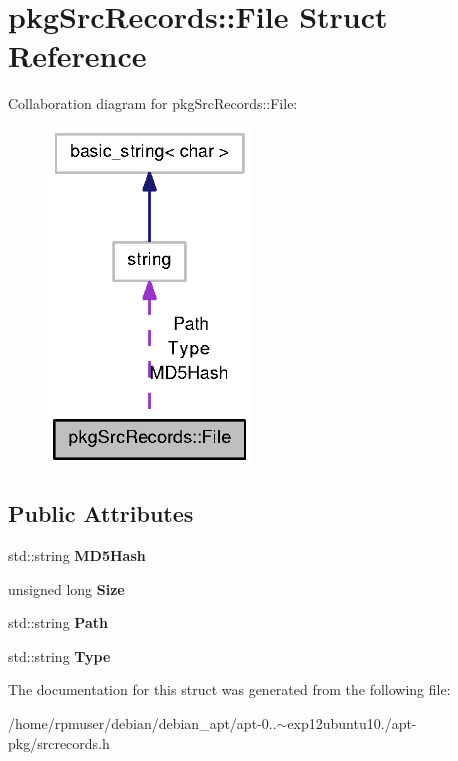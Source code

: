 \section{pkg\-Src\-Records\-:\-:\-File \-Struct \-Reference}
\label{structpkgSrcRecords_1_1File}


\-Collaboration diagram for pkg\-Src\-Records\-:\-:\-File\-:
\nopagebreak
\begin{figure}[H]
\begin{center}
\leavevmode
\includegraphics[width=152pt]{structpkgSrcRecords_1_1File__coll__graph}
\end{center}
\end{figure}
\subsection*{\-Public \-Attributes}
\begin{DoxyCompactItemize}
\item 
std\-::string {\bfseries \-M\-D5\-Hash}\label{structpkgSrcRecords_1_1File_a9121e1d4bb373ba413137f4e6acfeb43}

\item 
unsigned long {\bfseries \-Size}\label{structpkgSrcRecords_1_1File_adc25a45dd4fc0985b33c968068f749c4}

\item 
std\-::string {\bfseries \-Path}\label{structpkgSrcRecords_1_1File_a351e85bde61ab21378ab709e884be9ca}

\item 
std\-::string {\bfseries \-Type}\label{structpkgSrcRecords_1_1File_a6fcef4329ae329f0b7b6b8d739be7121}

\end{DoxyCompactItemize}


\-The documentation for this struct was generated from the following file\-:\begin{DoxyCompactItemize}
\item 
/home/rpmuser/debian/debian\-\_\-apt/apt-\/0..$\sim$exp12ubuntu10./apt-\/pkg/srcrecords.\-h\end{DoxyCompactItemize}
